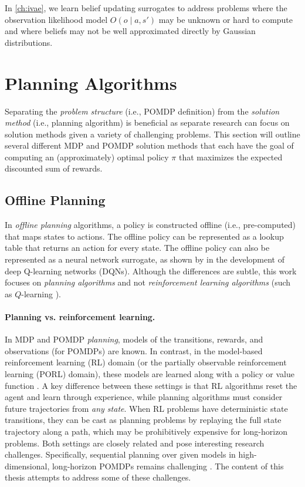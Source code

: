 

In \cref{ch:ivae}, we learn belief updating surrogates to address problems where the observation likelihood model $O(o \mid a, s')$ may be unknown or hard to compute and where beliefs may not be well approximated directly by Gaussian distributions.

\section{Planning Algorithms}\label{sec:planning_algs}
Separating the \textit{problem structure} (i.e., POMDP definition) from the \textit{solution method} (i.e., planning algorithm) is beneficial as separate research can focus on solution methods given a variety of challenging problems.
This section will outline several different MDP and POMDP solution methods that each have the goal of computing an (approximately) optimal policy $\pi$ that maximizes the expected discounted sum of rewards.

\subsection{Offline Planning}
In \textit{offline planning} algorithms, a policy is constructed offline (i.e., pre-computed) that maps states to actions.
The offline policy can be represented as a lookup table that returns an action for every state.
The offline policy can also be represented as a neural network surrogate, as shown by \textcite{mnih2013playing} in the development of deep Q-learning networks (DQNs).
Although the differences are subtle, this work focuses on \textit{planning algorithms} and not \textit{reinforcement learning algorithms} (such as $Q$-learning \cite{watkins1989learning}).

\paragraph{Planning vs. reinforcement learning.}
In MDP and POMDP \textit{planning}, models of the transitions, rewards, and observations (for POMDPs) are known.
In contrast, in the model-based reinforcement learning (RL) domain (or the partially observable reinforcement learning (PORL) domain), these models are learned along with a policy or value function \cite{sutton2018reinforcement,subramanian2022approximate}.
A key difference between these settings is that RL algorithms reset the agent and learn through experience, while planning algorithms must consider future trajectories from \textit{any state}.
When RL problems have deterministic state transitions, they can be cast as planning problems by replaying the full state trajectory along a path, which may be prohibitively expensive for long-horizon problems.
Both settings are closely related and pose interesting research challenges.
Specifically, sequential planning over given models in high-dimensional, long-horizon POMDPs remains challenging \cite{lauri2022partially}.
The content of this thesis attempts to address some of these challenges.


